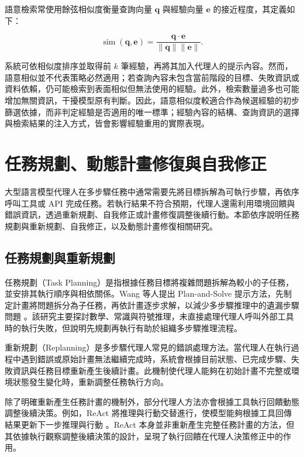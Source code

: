 語意檢索常使用餘弦相似度衡量查詢向量 $\mathbf{q}$ 與經驗向量 $\mathbf{e}$ 的接近程度，其定義如下：

\begin{equation}
    \operatorname{sim}(\mathbf{q},\mathbf{e}) =
    \frac{\mathbf{q} \cdot \mathbf{e}}
    {\lVert \mathbf{q} \rVert \lVert \mathbf{e} \rVert}.
\end{equation}

系統可依相似度排序並取得前 $k$ 筆經驗，再將其加入代理人的提示內容。然而，語意相似並不代表策略必然適用；若查詢內容未包含當前階段的目標、失敗資訊或資料依賴，仍可能檢索到表面相似但無法使用的經驗。此外，檢索數量過多也可能增加無關資訊，干擾模型原有判斷。因此，語意相似度較適合作為候選經驗的初步篩選依據，而非判定經驗是否適用的唯一標準；經驗內容的結構、查詢資訊的選擇與檢索結果的注入方式，皆會影響經驗重用的實際表現。

\section{任務規劃、動態計畫修復與自我修正}

大型語言模型代理人在多步驟任務中通常需要先將目標拆解為可執行步驟，再依序呼叫工具或 API 完成任務。若執行結果不符合預期，代理人還需利用環境回饋與錯誤資訊，透過重新規劃、自我修正或計畫修復調整後續行動。本節依序說明任務規劃與重新規劃、自我修正，以及動態計畫修復相關研究。

\subsection{任務規劃與重新規劃}

任務規劃（Task Planning）是指根據任務目標將複雜問題拆解為較小的子任務，並安排其執行順序與相依關係。Wang 等人提出 Plan-and-Solve 提示方法，先制定計畫將問題拆分為子任務，再依計畫逐步求解，以減少多步驟推理中的遺漏步驟問題 \cite{wang2023planandsolve}。該研究主要探討數學、常識與符號推理，未直接處理代理人呼叫外部工具時的執行失敗，但說明先規劃再執行有助於組織多步驟推理流程。

重新規劃（Replanning）是多步驟代理人常見的錯誤處理方法。當代理人在執行過程中遇到錯誤或原始計畫無法繼續完成時，系統會根據目前狀態、已完成步驟、失敗資訊與任務目標重新產生後續計畫。此機制使代理人能夠在初始計畫不完整或環境狀態發生變化時，重新調整任務執行方向。

除了明確重新產生任務計畫的機制外，部分代理人方法亦會根據工具執行回饋動態調整後續決策。例如，ReAct 將推理與行動交替進行，使模型能夠根據工具回傳結果更新下一步推理與行動 \cite{yao2023react}。ReAct 本身並非重新產生完整任務計畫的方法，但其依據執行觀察調整後續決策的設計，呈現了執行回饋在代理人決策修正中的作用。

